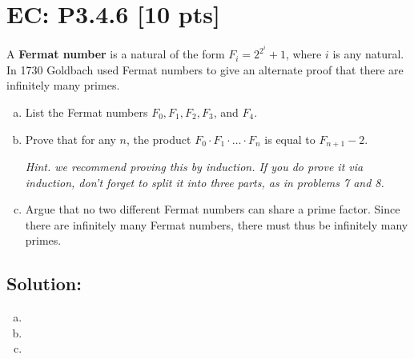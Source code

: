 \documentclass[12pt]{article}
\begin{document}
\newpage

\section*{\textbf{EC: P3.4.6} [10 pts]}
A \textbf{Fermat number} is a natural of the form $F_i = 2^{2^i} + 1$, where $i$ is any natural. In 1730 Goldbach used Fermat numbers to give an alternate proof that there are infinitely many primes.
\begin{enumerate}[(a)]

    \item List the Fermat numbers $F_0, F_1, F_2, F_3$, and $F_4$.
    
    \item Prove that for any $n$, the product $F_0 \cdot F_1 \cdot \ldots \cdot F_n$ is equal to $F_{n+1} - 2$.
    
    {\em Hint. we recommend proving this by induction.  If you do prove it via induction, don't forget to split it into three parts, as in problems 7 and 8.}
    
    
    \item Argue that no two different Fermat numbers can share a prime factor. Since there are infinitely many Fermat numbers, there must thus be infinitely many primes.
    
\end{enumerate}



\subsection*{\textbf{Solution:}}
\begin{enumerate}[(a)]

    \item
  
    
    \item  
    
    
    \item 
    
\end{enumerate}
\end{document}

